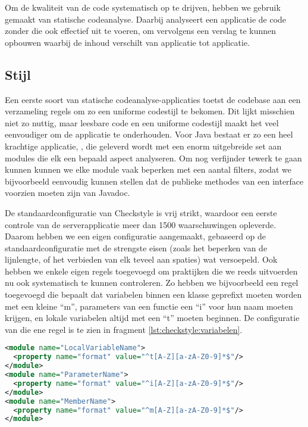 Om de kwaliteit van de code systematisch op te drijven, hebben we gebruik gemaakt van statische codeanalyse. Daarbij analyseert een applicatie de code zonder die ook effectief uit te voeren, om vervolgens een verslag te kunnen opbouwen waarbij de inhoud verschilt van applicatie tot applicatie.

\subsection{Stijl}
\label{server:realisatie:codeanalyse:stijl}

Een eerste soort van statische codeanalyse-applicaties toetst de codebase aan een verzameling regels om zo een uniforme codestijl te bekomen. Dit lijkt misschien niet zo nuttig, maar leesbare code en een uniforme codestijl maakt het veel eenvoudiger om de applicatie te onderhouden.
Voor Java bestaat er zo een heel krachtige applicatie, , die geleverd wordt met een enorm uitgebreide set aan modules die elk een bepaald aspect analyseren. Om nog verfijnder tewerk te gaan kunnen kunnen we elke module vaak beperken met een aantal filters, zodat we bijvoorbeeld eenvoudig kunnen stellen dat de publieke methodes van een interface voorzien moeten zijn van Javadoc.

De standaardconfiguratie van Checkstyle is vrij strikt, waardoor een eerste controle van de serverapplicatie meer dan 1500 waarschuwingen opleverde. Daarom hebben we een eigen configuratie aangemaakt, gebaseerd op de standaardconfiguratie met de strengste eisen (zoals het beperken van de lijnlengte, of het verbieden van elk teveel aan spaties) wat versoepeld. Ook hebben we enkele eigen regels toegevoegd om praktijken die we reeds uitvoerden nu ook systematisch te kunnen controleren. Zo hebben we bijvoorbeeld een regel toegevoegd die bepaalt dat variabelen binnen een klasse geprefixt moeten worden met een kleine ``m'', parameters van een functie een ``i'' voor hun naam moeten krijgen, en lokale variabelen altijd met een ``t'' moeten beginnen. De configuratie van die ene regel is te zien in fragment \ref{lst:checkstyle:variabelen}.

\begin{lstlisting}[language=XML, float, caption="Checkstyle configuratie voor de naamgeving van variabelen., label=lst:checkstyle:variabelen]
<module name="LocalVariableName">
  <property name="format" value="^t[A-Z][a-zA-Z0-9]*$"/>
</module>
<module name="ParameterName">
  <property name="format" value="^i[A-Z][a-zA-Z0-9]*$"/>
</module>
<module name="MemberName">
  <property name="format" value="^m[A-Z][a-zA-Z0-9]*$"/>
</module>
\end{lstlisting}

